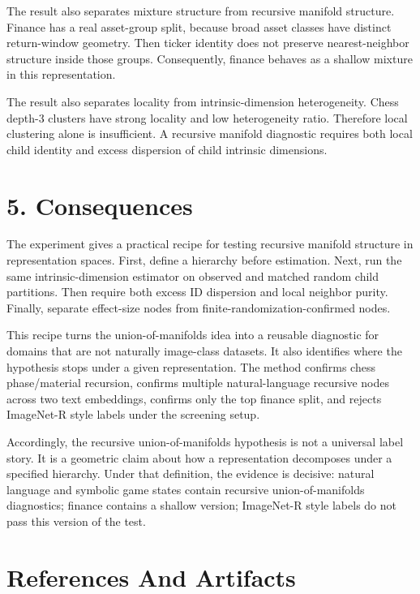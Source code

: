\documentclass[11pt]{article}
\begin{document}
The result also separates mixture structure from recursive manifold structure. Finance has a real asset-group split, because broad asset classes have distinct return-window geometry. Then ticker identity does not preserve nearest-neighbor structure inside those groups. Consequently, finance behaves as a shallow mixture in this representation.

The result also separates locality from intrinsic-dimension heterogeneity. Chess depth-3 clusters have strong locality and low heterogeneity ratio. Therefore local clustering alone is insufficient. A recursive manifold diagnostic requires both local child identity and excess dispersion of child intrinsic dimensions.

\section{5. Consequences}\label{consequences}

The experiment gives a practical recipe for testing recursive manifold structure in representation spaces. First, define a hierarchy before estimation. Next, run the same intrinsic-dimension estimator on observed and matched random child partitions. Then require both excess ID dispersion and local neighbor purity. Finally, separate effect-size nodes from finite-randomization-confirmed nodes.

This recipe turns the union-of-manifolds idea into a reusable diagnostic for domains that are not naturally image-class datasets. It also identifies where the hypothesis stops under a given representation. The method confirms chess phase/material recursion, confirms multiple natural-language recursive nodes across two text embeddings, confirms only the top finance split, and rejects ImageNet-R style labels under the screening setup.

Accordingly, the recursive union-of-manifolds hypothesis is not a universal label story. It is a geometric claim about how a representation decomposes under a specified hierarchy. Under that definition, the evidence is decisive: natural language and symbolic game states contain recursive union-of-manifolds diagnostics; finance contains a shallow version; ImageNet-R style labels do not pass this version of the test.

\section{References And Artifacts}\label{references-and-artifacts}
\end{document}
